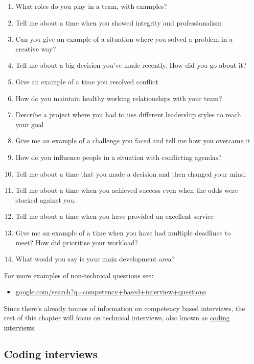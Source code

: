 \documentclass[
]{book}
\providecommand{\tightlist}{%
  \setlength{\itemsep}{0pt}\setlength{\parskip}{0pt}}
\begin{document}
\begin{enumerate}
\def\labelenumi{\arabic{enumi}.}
\tightlist
\item
  What roles do you play in a team, with examples?
\item
  Tell me about a time when you showed integrity and professionalism
\item
  Can you give an example of a situation where you solved a problem in a creative way?
\item
  Tell me about a big decision you've made recently. How did you go about it?
\item
  Give an example of a time you resolved conflict
\item
  How do you maintain healthy working relationships with your team?
\item
  Describe a project where you had to use different leadership styles to reach your goal
\item
  Give me an example of a challenge you faced and tell me how you overcame it
\item
  How do you influence people in a situation with conflicting agendas?
\item
  Tell me about a time that you made a decision and then changed your mind.
\item
  Tell me about a time when you achieved success even when the odds were stacked against you.
\item
  Tell me about a time when you have provided an excellent service
\item
  Give me an example of a time when you have had multiple deadlines to meet? How did prioritise your workload?
\item
  What would you say is your main development area?
\end{enumerate}

For more examples of non-technical questions see:

\begin{itemize}
\tightlist
\item
  \href{https://www.google.com/search?q=competency+based+interview+questions}{google.com/search?q=competency+based+interview+questions}
\end{itemize}

Since there's already tonnes of information on competency based interviews, the rest of this chapter will focus on technical interviews, also known as \href{https://en.wikipedia.org/wiki/Coding_interview}{coding interviews}.

\hypertarget{codinginterview}{%
\subsection{Coding interviews}\label{codinginterview}}
\end{document}
